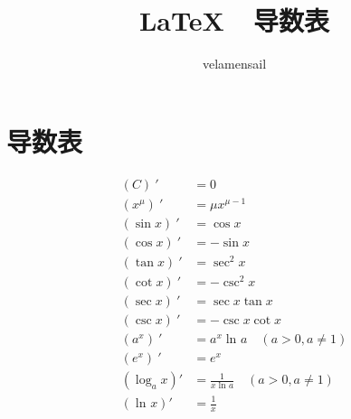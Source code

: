 \documentclass[utf8,a4paper,12pt]{ctexart}
\title{\LaTeX~~导数表}
\author{velamensail}
\date{}
\begin{document}
        
    \maketitle  
    \section{导数表}   
      \begin{equation}  
        \begin{split}   %
          (C)~'&=0\\
          (x^\mu)~'&=\mu x^{\mu-1}\\
          (\sin x)~'&=\cos x\\
          (\cos x)~'&=-\sin x\\
          (\tan x)~'&=\sec^2 x\\
          (\cot x)~'&=-\csc^2 x\\
          (\sec x)~'&=\sec x\tan x\\
          (\csc x{})~'&=-\csc x\cot x\\
          (a^x)~'&=a^x\ln_{}{a}\quad(a> 0,a\neq1)\\
          (e^x)~'&=e^x\\
          (\log_{a}{x})'&=\frac{1}{x\ln_{}{a}}\quad(a> 0,a\neq1)\\
          (\ln_{}{x})'&=\frac{1}{x} \\
        \end{split}
    \end{equation}
\end{document}
